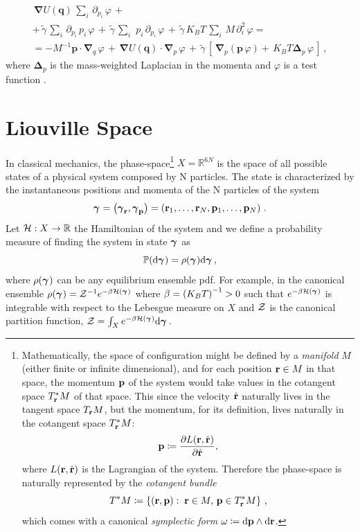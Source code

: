 \documentclass[10pt,a4paper]{book}
\theoremstyle{definition}
\begin{document}
\begin{appendices}
\begin{multline*}
                          \,\boldsymbol{\nabla}U(\mathbf{q})\,\sum_i\,\partial_{p_i}\,\varphi\,+{}\\                          
                          +\,\widetilde{\gamma}\,\sum_i\,\partial_{p_i}\,p_i\,\varphi\,+
                          \,\widetilde{\gamma}\,\sum_i\,\,p_i\,\partial_{p_i}\,\varphi\,+
                          \,\widetilde{\gamma}\,K_BT\,\sum_i\,M\,\partial_i^2\,\varphi={}\\
                          =-M^{-1}\mathbf{p}\cdot\boldsymbol{\nabla}_{q}\,\varphi\,+
                          \,\boldsymbol{\nabla}U(\mathbf{q})\cdot\boldsymbol{\nabla}_{p}\,\varphi\,+
                          \,\widetilde{\gamma}\, \left[ \,\boldsymbol{\nabla}_{p}(\mathbf{p}\,\varphi)+
                          \,K_BT\boldsymbol{\Delta}_{p}\,\varphi \,\right]\,,
\end{multline*}
where $\boldsymbol{\Delta}_{p}$ is the mass-weighted Laplacian in the momenta and $\varphi$ is a test function \cite{Risk:TheFPeq}.




\chapter{Liouville Space}
\label{App:C}
In classical mechanics, the phase-space\footnote{
Mathematically, the space of configuration might be defined by a \emph{manifold} $M$ (either finite or infinite dimensional), and for each position $\mathbf{r}\in M$ in that space, the momentum $\mathbf{p}$ of the system would take values in the cotangent space $T^*_{\mathbf{r}}M$ of that space. This since the velocity $\dot{\mathbf{r}}$ naturally lives in the tangent space $T_{\mathbf{r}}M$, but the momentum, for its definition, lives naturally in the cotangent space $T^*_{\mathbf{r}}M$:
$$\mathbf{p} \coloneqq \frac{\partial L(\mathbf{r},\dot{\mathbf{r}})}{\partial\dot{\mathbf{r}}},$$ where $L(\mathbf{r},\dot{\mathbf{r}})$ is the Lagrangian of the system. 
Therefore the phase-space is naturally represented by the \emph{cotangent bundle} $$T^*M \coloneqq \left\lbrace \left(\mathbf{r},\mathbf{p}\right):\;\mathbf{r}\in M,\,\mathbf{p}\in T^*_{\mathbf{r}}M\right\rbrace\,,$$ which comes with a canonical \emph{symplectic form} $\omega\coloneqq \mbox{d}\mathbf{p} \wedge \mbox{d}\mathbf{r}$.
} 
$X=\mathbb{R}^{6N}$ is the space of all possible states of a physical system composed by N particles. The state is characterized by the instantaneous positions and momenta of the N particles of the system
\begin{equation}\label{gamma}
 \boldsymbol\gamma_{}=\left( \boldsymbol\gamma_{\mathbf{r}},\boldsymbol\gamma_{\mathbf{p}} \right)=\left( \mathbf{r}_1,\ldots,\mathbf{r}_N , \mathbf{p}_1,\ldots,\mathbf{p}_N \right)\,.
\end{equation}
Let $\mathcal{H}:X\to \mathbb{R}$ the Hamiltonian of the system and we define a probability measure of finding the system in state $\boldsymbol\gamma_{}$ as 
$$
\mathbb{P}(\mbox{d}\boldsymbol\gamma_{}) = \rho(\boldsymbol\gamma_{})\mbox{d}\boldsymbol\gamma_{}\,,
$$
where $\rho(\boldsymbol\gamma_{})$ can be any equilibrium ensemble pdf. For example, in the canonical ensemble $\rho(\boldsymbol\gamma_{})=\mathcal{Z}^{-1}e^{-\beta\mathcal{H}(\boldsymbol\gamma_{})}$ where $\beta=\left(K_BT\right)^{-1}>0$ such that $e^{-\beta\mathcal{H}(\boldsymbol\gamma_{})}$ is integrable with respect to the Lebesgue measure on $X$ and $\mathcal{Z}$ is the canonical partition function, 
$\mathcal{Z}=\int_Xe^{-\beta\mathcal{H}(\boldsymbol\gamma_{})}\mbox{d}\boldsymbol\gamma_{}\,.$


\end{appendices}
\end{document}
